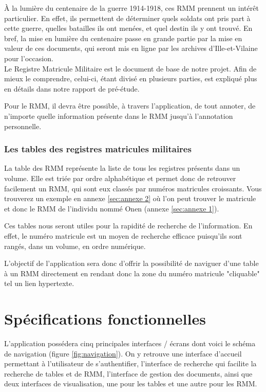\documentclass[a4paper]{article}
\begin{document}
	\`A la lumière du centenaire de la guerre 1914-1918, ces RMM prennent un intérêt particulier. En effet, ils permettent de déterminer quels soldats ont pris part à cette guerre, quelles batailles ils ont menées, et quel destin ils y ont trouvé. En bref, la mise en lumière du centenaire passe en grande partie par la mise en valeur de ces documents, qui seront mis en ligne par les archives d'Ille-et-Vilaine pour l'occasion.\\

	Le Registre Matricule Militaire est le document de base de notre projet. Afin de mieux le comprendre, celui-ci, étant divisé en plusieurs parties, est expliqué plus en détails dans notre rapport de pré-étude.

	Pour le RMM, il devra être possible, à travers l'application, de tout annoter, de n'importe quelle information présente dans le RMM jusqu'à l'annotation personnelle. 

\subsubsection{Les tables des registres matricules militaires}
	La table des RMM représente la liste de tous les registres présents dans un volume. Elle est triée par ordre alphabétique et permet donc de retrouver facilement un RMM, qui sont eux classés par numéros matricules croissants. Vous trouverez un exemple en annexe \ref{sec:annexe 2} où l'on peut trouver le matricule et donc le RMM de l'individu nommé Onen (annexe \ref{sec:annexe 1}).

	Ces tables nous seront utiles pour la rapidité de recherche de l'information. En effet, le numéro matricule est un moyen de recherche efficace puisqu'ils sont rangés, dans un volume, en ordre numérique. 

	L'objectif de l'application sera donc d'offrir la possibilité de naviguer d'une table à un RMM directement en rendant donc la zone du numéro matricule "cliquable" tel un lien hypertexte.

\section{Spécifications fonctionnelles}

	L’application possédera cinq principales interfaces / écrans dont voici le schéma de navigation (figure \ref{fig:navigation}). On y retrouve une interface d'accueil permettant à l'utilisateur de s'authentifier, l'interface de recherche qui facilite la recherche de tables et de RMM, l'interface de gestion des documents, ainsi que deux interfaces de visualisation, une pour les tables et une autre pour les RMM.
\end{document}
